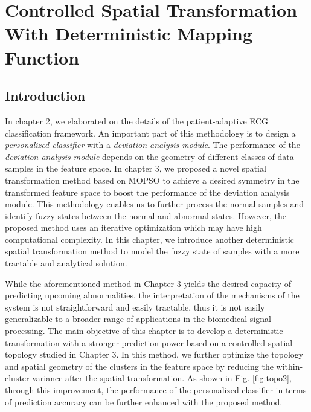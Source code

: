 \chapter{Controlled Spatial Transformation With Deterministic Mapping Function}
\section{Introduction}


 In chapter 2, we elaborated on the details of the patient-adaptive ECG classification framework. An important part of this methodology is to design a \textit{personalized classifier} with a \textit{deviation analysis module}. The performance of the \textit{deviation analysis module} depends on the geometry of different classes of data samples in the feature space. In chapter 3, we proposed a novel spatial transformation method based on MOPSO to  achieve a desired symmetry in the transformed feature space to boost the performance of the deviation analysis module. This methodology enables us to further process the normal samples and identify fuzzy states between the normal and abnormal states. However, the proposed method uses an iterative optimization which may have high computational complexity. In this chapter, we introduce another deterministic spatial transformation method to model the fuzzy state of samples with a more tractable and analytical solution. %

 
While the aforementioned method in Chapter 3 yields the desired capacity of predicting upcoming abnormalities, the interpretation of the mechanisms of the system is not straightforward and easily tractable, thus it is not easily generalizable to a broader range of applications in the biomedical signal processing. The main objective of this chapter is to develop a deterministic transformation with a stronger prediction power based on a controlled spatial topology studied in Chapter 3. In this method, we further optimize the topology and spatial geometry of the clusters in the feature space by reducing the within-cluster variance after the spatial transformation. As shown in Fig. \ref{fig:topo2}, through this improvement, the performance of the personalized classifier in terms of prediction accuracy can be further enhanced with the proposed method.
 
